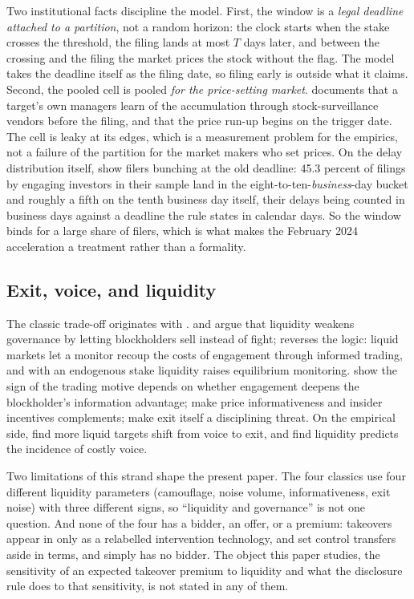\documentclass[11pt]{article}
\begin{document}
Two institutional facts discipline the model. First, the window is a \emph{legal deadline attached
to a partition}, not a random horizon: the clock starts when the stake crosses the threshold, the
filing lands at most $T$ days later, and between the crossing and the filing the market prices the
stock without the flag. The model takes the deadline itself as the filing date, so filing early is
outside what it claims. Second, the pooled cell is pooled \emph{for the price-setting market}.
\citet{Zeng2026} documents that a target's own managers learn of the accumulation through
stock-surveillance vendors before the filing, and that the price run-up begins on the trigger date.
The cell is leaky at its edges, which is a measurement problem for the empirics, not a failure
of the partition for the market makers who set prices. On the delay distribution itself,
\citet{BebchukBravJacksonJiang2013} show filers bunching at the old deadline: 45.3 percent of
filings by engaging investors in their sample land in the eight-to-ten-\emph{business}-day bucket
and roughly a fifth on the tenth business day itself, their delays being counted in business days
against a deadline the rule states in calendar days. So the window binds for a large share of filers, which is what makes the February 2024
acceleration a treatment rather than a formality.

\subsection{Exit, voice, and liquidity}
\label{sec:lit-exit-voice}

The classic trade-off originates with \citet{Hirschman1970}. \citet{Coffee1991} and \citet{Bhide1993}
argue that liquidity weakens governance by letting blockholders sell instead of fight;
\citet{Maug1998} reverses the logic: liquid markets let a monitor recoup the costs of engagement
through informed trading, and with an endogenous stake liquidity raises equilibrium monitoring.
\citet{KahnWinton1998} show the sign of the trading motive depends on whether engagement deepens the
blockholder's information advantage; \citet{FaureGrimaudGromb2004} make price informativeness and
insider incentives complements; \citet{AdmatiPfleiderer2009} make exit itself a disciplining threat.
On the empirical side, \citet{EdmansFangZur2013} find more liquid targets shift from voice to exit,
and \citet{NorliOstergaardSchindele2015} find liquidity predicts the incidence of costly voice.

Two limitations of this strand shape the present paper. The four classics use four different
liquidity parameters (camouflage, noise volume, informativeness, exit noise) with three
different signs, so ``liquidity and governance'' is not one question. And none of the four has a
bidder, an offer, or a premium: takeovers appear in \citet{Maug1998} only as a relabelled intervention
technology, \citet{KahnWinton1998} and \citet{FaureGrimaudGromb2004} set control transfers aside in
terms, and \citet{AdmatiPfleiderer2009} simply has no bidder. The object this paper studies,
the sensitivity of an expected takeover premium to liquidity and what the disclosure rule does
to that sensitivity, is not stated in any of them.
\end{document}
